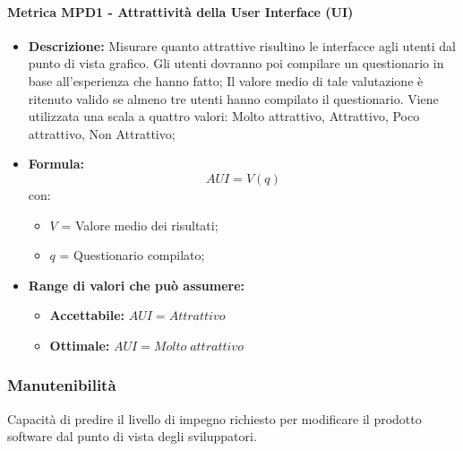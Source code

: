 \paragraph{Metrica MPD1 - Attrattività della User Interface (UI)} 
\begin{itemize}
    \item \textbf{Descrizione:} Misurare quanto attrattive risultino le interfacce agli utenti dal punto di vista grafico.
    Gli utenti dovranno poi compilare un questionario in base all'esperienza che hanno fatto;
    Il valore medio di tale valutazione è ritenuto valido se almeno tre utenti hanno compilato il questionario. 
    Viene utilizzata una scala a quattro valori: Molto attrattivo, Attrattivo, Poco attrattivo, Non Attrattivo;
\item \textbf{Formula:}$$AUI = V(q) $$
    con:
        \begin{itemize}
        \item $V$ = Valore medio dei risultati;
        \item $q$ = Questionario compilato;
        \end{itemize}
    \item \textbf{Range di valori che può assumere:}
        \begin{itemize}
            \item \textbf{Accettabile:} $AUI = Attrattivo$ 
            \item \textbf{Ottimale:} $AUI = Molto \; attrattivo$
        \end{itemize}
\end{itemize}

\subsubsection{Manutenibilità} 
Capacità di predire il livello di impegno richiesto per modificare il prodotto software dal punto di vista degli sviluppatori.           
